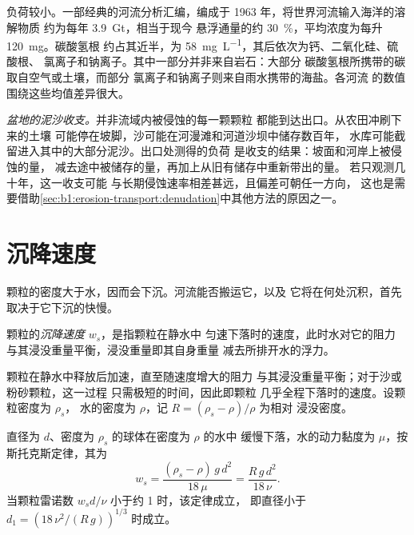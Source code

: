 负荷较小。一部经典的河流分析汇编，编成于
1963 年，将世界河流输入海洋的溶解物质
约为每年 \qty{3.9}{Gt}，相当于现今
悬浮通量的约 \qty{30}{\percent}，平均浓度为每升 \qty{120}{mg}。碳酸氢根
约占其近半，为 \qty{58}{mg.L^{-1}}，其后依次为钙、二氧化硅、硫酸根、
氯离子和钠离子。其中一部分并非来自岩石：大部分
碳酸氢根所携带的碳取自空气或土壤，而部分
氯离子和钠离子则来自雨水携带的海盐。各河流
的数值围绕这些均值差异很大。

\emph{盆地的泥沙收支。}并非流域内被侵蚀的每一颗颗粒
都能到达出口。从农田冲刷下来的土壤
可能停在坡脚，沙可能在河漫滩和河道沙坝中储存数百年，
水库可能截留进入其中的大部分泥沙。出口处测得的负荷
是收支的结果：坡面和河岸上被侵蚀的量，
减去途中被储存的量，再加上从旧有储存中重新带出的量。
若只观测几十年，这一收支可能
与长期侵蚀速率相差甚远，且偏差可朝任一方向，
这也是需要借助\cref{sec:b1:erosion-transport:denudation}中其他方法的原因之一。

\section{沉降速度}\label{sec:b1:erosion-transport:settling}

颗粒的密度大于水，因而会下沉。河流能否搬运它，以及
它将在何处沉积，首先取决于它下沉的快慢。

\begin{definition}[沉降速度]\label{def:b1:erosion-transport:settling}
颗粒的\emph{沉降速度} $w_s$，是指颗粒在静水中
匀速下落时的速度，此时水对它的阻力
与其浸没重量平衡，浸没重量即其自身重量
减去所排开水的浮力。
\end{definition}

颗粒在静水中释放后加速，直至随速度增大的阻力
与其浸没重量平衡；对于沙或粉砂颗粒，这一过程
只需极短的时间，因此即颗粒
几乎全程下落时的速度。设颗粒密度为 $\rho_s$，
水的密度为 $\rho$，记 $R = (\rho_s - \rho)/\rho$ 为相对
浸没密度。

\begin{proposition}[斯托克斯沉降]\label{prop:b1:erosion-transport:stokes}
直径为 $d$、密度为 $\rho_s$ 的球体在密度为 $\rho$ 的水中
缓慢下落，水的动力黏度为 $\mu$，按斯托克斯定律，其为
\[
  w_s = \frac{(\rho_s - \rho)\,g\,d^2}{18\,\mu} = \frac{R\,g\,d^2}{18\,\nu}.
\]
当颗粒雷诺数 $w_s d/\nu$ 小于约 1 时，该定律成立，
即直径小于 $d_1 = \left(18\,\nu^2/(R\,g)\right)^{1/3}$ 时成立。
\end{proposition}

